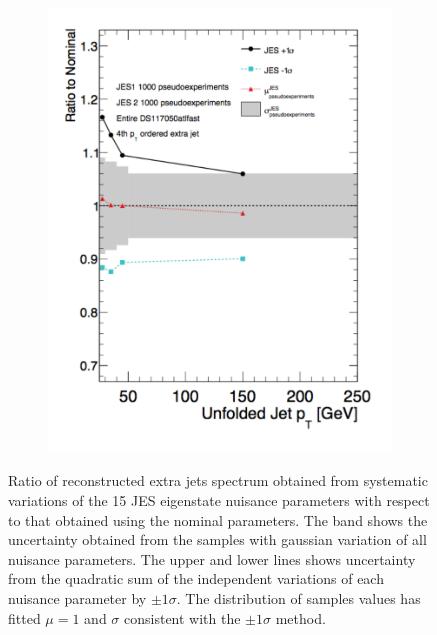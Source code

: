 \begin{figure}
\begin{subfigure}[]{0.45\textwidth}
\includegraphics[width=\textwidth]{fig/UnfoldSys/JESJet3.pdf}
\end{subfigure}
\caption{Ratio of reconstructed extra jets spectrum obtained from systematic variations of the 15 JES eigenstate nuisance parameters with respect to that obtained using the nominal parameters. The band shows the uncertainty obtained from the samples with gaussian variation of all nuisance parameters. The upper and lower lines shows uncertainty from the quadratic sum of the independent variations of each nuisance parameter by $\pm 1 \sigma$. The distribution of samples values has fitted $\mu=1$ and $\sigma$ consistent with the $\pm 1 \sigma$ method. }
\label{fig:ToyJES1}
\end{figure}




